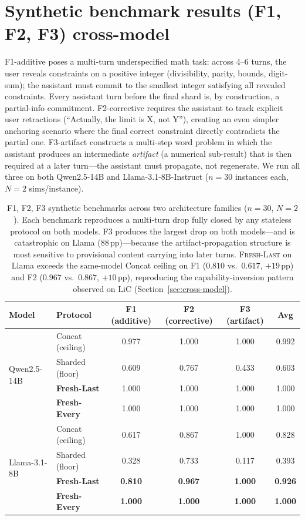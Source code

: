 \documentclass{article}
\begin{document}
\section{Synthetic benchmark results (F1, F2, F3) cross-model}
\label{app:synthetic}

F1-additive poses a multi-turn underspecified math task: across 4--6 turns, the user reveals constraints on a positive integer (divisibility, parity, bounds, digit-sum); the assistant must commit to the smallest integer satisfying all revealed constraints. Every assistant turn before the final shard is, by construction, a partial-info commitment. F2-corrective requires the assistant to track explicit user retractions (``Actually, the limit is X, not Y''), creating an even simpler anchoring scenario where the final correct constraint directly contradicts the partial one. F3-artifact constructs a multi-step word problem in which the assistant produces an intermediate \emph{artifact} (a numerical sub-result) that is then required at a later turn---the assistant must propagate, not regenerate. We run all three on both Qwen2.5-14B and Llama-3.1-8B-Instruct ($n{=}30$ instances each, $N{=}2$ sims/instance).

\begin{table}[h]
\centering
\caption{F1, F2, F3 synthetic benchmarks across two architecture families ($n{=}30$, $N{=}2$). Each benchmark reproduces a multi-turn drop fully closed by any stateless protocol on both models. F3 produces the largest drop on both models---and is catastrophic on Llama (88\,pp)---because the artifact-propagation structure is most sensitive to provisional content carrying into later turns. \textsc{Fresh-Last} on Llama exceeds the same-model Concat ceiling on F1 ($0.810$ vs.\ $0.617$, $+19$\,pp) and F2 ($0.967$ vs.\ $0.867$, $+10$\,pp), reproducing the capability-inversion pattern observed on LiC (Section~\ref{sec:cross-model}).}
\label{tab:f1f2f3}
\begin{tabular}{llcccc}
\toprule
Model & Protocol & F1 (additive) & F2 (corrective) & F3 (artifact) & Avg \\
\midrule
\multirow{4}{*}{Qwen2.5-14B}
 & Concat (ceiling) & 0.977 & 1.000 & 1.000 & 0.992 \\
 & Sharded (floor) & 0.609 & 0.767 & 0.433 & 0.603 \\
 & \textbf{Fresh-Last} & 1.000 & 1.000 & 1.000 & 1.000 \\
 & \textbf{Fresh-Every} & 1.000 & 1.000 & 1.000 & 1.000 \\
\midrule
\multirow{4}{*}{Llama-3.1-8B}
 & Concat (ceiling) & 0.617 & 0.867 & 1.000 & 0.828 \\
 & Sharded (floor) & 0.328 & 0.733 & 0.117 & 0.393 \\
 & \textbf{Fresh-Last} & \textbf{0.810} & \textbf{0.967} & \textbf{1.000} & \textbf{0.926} \\
 & \textbf{Fresh-Every} & \textbf{1.000} & \textbf{1.000} & \textbf{1.000} & \textbf{1.000} \\
\bottomrule
\end{tabular}
\end{table}
\end{document}
